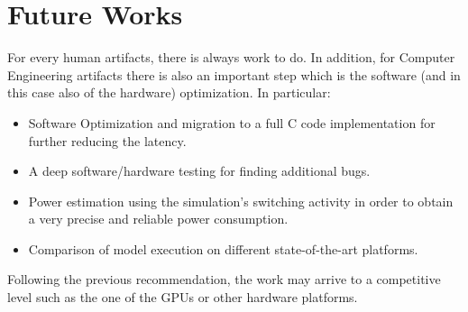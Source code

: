 \section{Future Works}
For every human artifacts, there is always work to do. In addition, for Computer Engineering artifacts there is also an important step which is the software (and in this case also of the hardware) optimization.
In particular:

\begin{itemize}
\item Software Optimization and migration to a full C code implementation for further reducing the latency.
\item A deep software/hardware testing for finding additional bugs.
\item Power estimation using the simulation’s switching activity in order to obtain a very precise and reliable power consumption.
\item Comparison of model execution on different state-of-the-art platforms.\\
\end{itemize}

Following the previous recommendation, the work may arrive to a competitive level such as the one of the GPUs or other hardware platforms.

